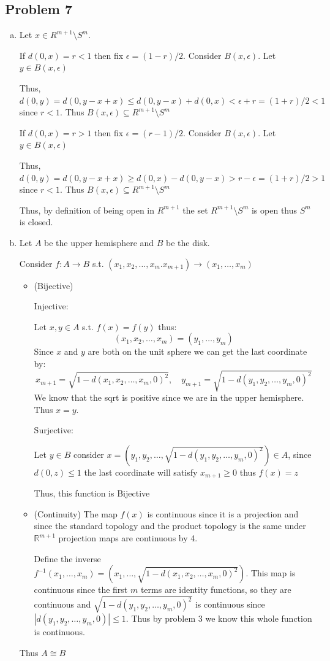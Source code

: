 \documentclass[12pt, letterpaper]{article}
\theoremstyle{definition}
\newcommand{\R}{\mathbb{R}}
\begin{document}
\newpage
\subsection*{Problem 7}
\begin{enumerate}[(a)]
    \item Let $x \in R^{m+1} \setminus S^m$.
    
    If $d(0,x)=r<1$ then fix $\epsilon=(1-r)/2$. Consider $B(x,\epsilon)$. Let $y \in B(x,\epsilon)$

    Thus, $d(0,y)=d(0,y-x+x)\leq d(0,y-x)+d(0,x)< \epsilon + r = (1+r)/2 < 1$ since $r<1$. Thus $B(x,\epsilon) \subseteq R^{m+1} \setminus S^m$

    If $d(0,x)=r>1$ then fix $\epsilon=(r-1)/2$. Consider $B(x,\epsilon)$. Let $y \in B(x,\epsilon)$

    Thus, $d(0,y)=d(0,y-x+x)\geq d(0,x)-d(0,y-x) > r - \epsilon = (1+r)/2 > 1$ since $r<1$. Thus $B(x,\epsilon) \subseteq R^{m+1} \setminus S^m$

    Thus, by definition of being open in $R^{m+1}$ the set $R^{m+1} \setminus S^m$ is open thus $S^m$ is closed.

    \item Let $A$ be the upper hemisphere and $B$ be the disk. 
    
    Consider $f: A \to B$ s.t. $(x_1,x_2,\dots,x_m.x_{m+1}) \to (x_1,\dots,x_m)$

    \begin{itemize}
        \item (Bijective)
        
        Injective:
        
        Let $x,y \in A$ s.t. $f(x)=f(y)$ thus:
        \[(x_1,x_2,\dots,x_m)=(y_1,\dots,y_m)\]
        Since $x$ and $y$ are both on the unit sphere we can get the last coordinate by:
        \[x_{m+1}=\sqrt{1-d(x_1,x_2,\dots,x_m,0)^2}, \quad y_{m+1}=\sqrt{1-d(y_1,y_2,\dots,y_m,0)^2}\]
        We know that the sqrt is positive since we are in the upper hemisphere. Thus $x=y$.

        Surjective:

        Let $y \in B$ consider $x=(y_1,y_2,\dots,\sqrt{1-d(y_1,y_2,\dots,y_m,0)^2}) \in A$, since $d(0,z) \leq 1$ the last coordinate will satisfy $x_{m+1} \geq 0$ thus $f(x)=z$

        Thus, this function is Bijective

        \item (Continuity) The map $f(x)$ is continuous since it is a projection and since the standard topology and the product topology is the same under $\R^{m+1}$ projection maps are continuous by 4.
        
        Define the inverse $f^{-1}(x_1,\dots,x_m)=(x_1,\dots,\sqrt{1-d(x_1,x_2,\dots,x_m,0)^2})$. This map is continuous since the first $m$ terms are identity functions, so they are continuous and $\sqrt{1-d(y_1,y_2,\dots,y_m,0)^2}$ is continuous since $|d(y_1,y_2,\dots,y_m,0)| \leq 1$. Thus by problem 3 we know this whole function is continuous.
    \end{itemize}
    Thus $A \cong B$
\end{enumerate}
\end{document}
